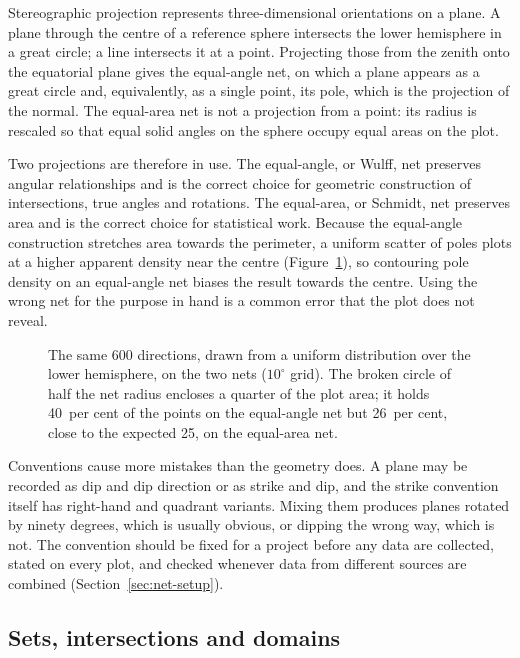 Stereographic projection represents three-dimensional orientations on a plane.
A plane through the centre of a reference sphere intersects the lower
hemisphere in a great circle; a line intersects it at a point. Projecting
those from the zenith onto the equatorial plane gives the equal-angle net, on
which a plane appears as a great circle and, equivalently, as a single point,
its pole, which is the projection of the normal. The equal-area net is not a
projection from a point: its radius is rescaled so that equal solid angles on
the sphere occupy equal areas on the plot.

Two projections are therefore in use. The equal-angle, or Wulff, net preserves
angular relationships and is the correct choice for geometric construction
of intersections, true angles and rotations. The equal-area, or Schmidt, net
preserves area and is the correct choice for statistical work. Because the
equal-angle construction stretches area towards the perimeter, a uniform
scatter of poles plots at a higher apparent density near the centre
(Figure~\ref{fig:net-density-bias}), so
contouring pole density on an equal-angle net biases the result towards the
centre. Using the wrong net for the purpose in hand is a common error that the plot does not reveal.

\begin{figure}[htbp]
\centering
{}
\caption{The same 600 directions, drawn from a uniform distribution over the lower hemisphere, on the two nets ($10^\circ$ grid). The broken circle of half the net radius encloses a quarter of the plot area; it holds 40~per cent of the points on the equal-angle net but 26~per cent, close to the expected 25, on the equal-area net.}
\label{fig:net-density-bias}
\end{figure}

Conventions cause more mistakes than the geometry does. A plane may be
recorded as dip and dip direction or as strike and dip, and the strike
convention itself has right-hand and quadrant variants. Mixing them produces
planes rotated by ninety degrees, which is usually obvious, or dipping the
wrong way, which is not. The convention should be fixed for a project before
any data are collected, stated on every plot, and checked whenever data from
different sources are combined (Section~\ref{sec:net-setup}).

\subsection{Sets, intersections and domains}
\label{sec:sets-and-intersections}

